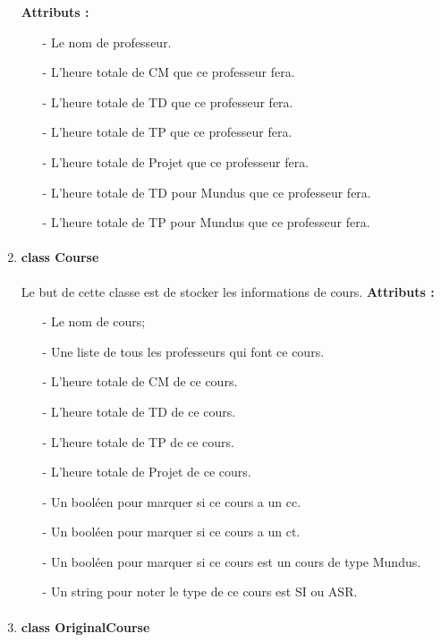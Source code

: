 \documentclass{polytech/polytech}
\begin{document}
\begin{enumerate}
			\textbf{Attributs :}
				\begin{itemize}
					\item[-] Le nom de professeur.
					\item[-] L'heure totale de CM que ce professeur fera.
					\item[-] L'heure totale de TD que ce professeur fera.
					\item[-] L'heure totale de TP que ce professeur fera.
					\item[-] L'heure totale de Projet que ce professeur fera.
					\item[-] L'heure totale de TD pour Mundus que ce professeur fera.
					\item[-] L'heure totale de TP pour Mundus que ce professeur fera.
				\end{itemize}

			\item \paragraph{class Course}

			Le but de cette classe est de stocker les informations de cours.
			\textbf{Attributs :}
				\begin{itemize}
					\item[-] Le nom de cours;
					\item[-] Une liste de tous les professeurs qui font ce cours.
					\item[-] L'heure totale de CM de ce cours.
					\item[-] L'heure totale de TD de ce cours.
					\item[-] L'heure totale de TP de ce cours.
					\item[-] L'heure totale de Projet de ce cours.
					\item[-] Un booléen pour marquer si ce cours a un cc.
					\item[-] Un booléen pour marquer si ce cours a un ct.
					\item[-] Un booléen pour marquer si ce cours est un cours de type Mundus.
					\item[-] Un string pour noter le type de ce cours est SI ou ASR.
				\end{itemize}
			\pagebreak

			\item \paragraph{class OriginalCourse}


\end{enumerate}
\end{document}
